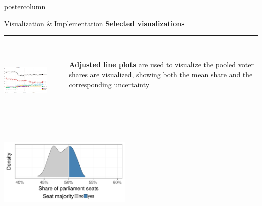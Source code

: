 \documentclass[final,hyperref={pdfpagelabels=false}]{beamer}
\newcommand{\bfBlue}[1]{\textcolor{koaladarkestblue}{\textbf{#1}}}
\begin{document}
\begin{frame}
\begin{columns}
\begin{column}{1\textwidth}
\begin{columns}[T]
\begin{column}{.484\textwidth}
\begin{beamercolorbox}[center,wd=\textwidth]{postercolumn}
\begin{minipage}[T]{.95\textwidth}
\begin{block}{\footnotesize Visualization \& Implementation}
\bfBlue{Selected visualizations}
\\[0.05cm]
\textcolor{LMUlightgray}{\hrule{}}
\vspace{1ex}
\begin{columns}[t]
  \begin{column}{.3\textwidth}
  \begin{center}\centering
  \includegraphics[height=120px]{figures/pooled_shares}
  \end{center}
  \end{column}

  \hspace{-1.5ex}
  \textcolor{LMUlightgray}{\vrule{}}
  \hspace{1.5ex}

  \begin{column}{.65\textwidth}
  \ \\
  \textbf{Adjusted line plots} are used to visualize the pooled voter shares are visualized, showing both the mean share and the corresponding uncertainty
  \end{column}
\end{columns}
\vspace{1ex}
\textcolor{LMUlightgray}{\hrule{}}
\vspace{1ex}
\begin{columns}[t]
  \begin{column}{.3\textwidth}
  \begin{center}\centering
  \includegraphics[height=120px]{figures/vis_seatDist}
  \end{center}
  \end{column}

  \hspace{-1.5ex}
  \textcolor{LMUlightgray}{\vrule{}}
  \hspace{1.5ex}


\end{columns}
\end{block}
\end{minipage}
\end{beamercolorbox}
\end{column}
\end{columns}
\end{column}
\end{columns}
\end{frame}
\end{document}
